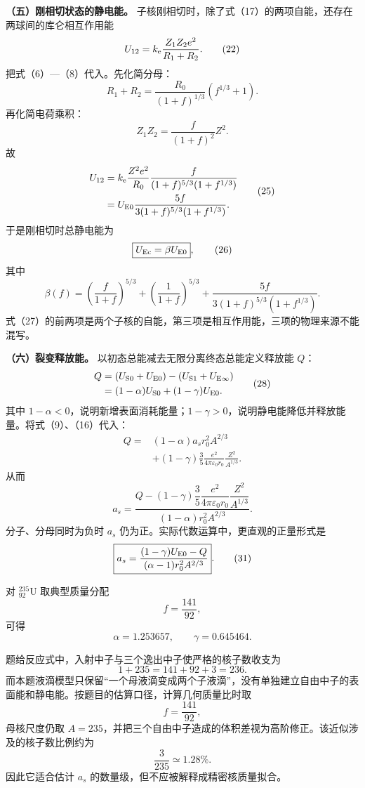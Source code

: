 \documentclass[12pt,a4paper,UTF8]{ctexart}
\begin{document}
\textbf{（五）刚相切状态的静电能。}
子核刚相切时，除了式（17）的两项自能，还存在两球间的库仑相互作用能 \[
U_{12}=k_{\rm e}\frac{Z_1Z_2e^2}{R_1+R_2}. \tag{22}
\] 把式（6）---（8）代入。先化简分母： \[
R_1+R_2
=\frac{R_0}{(1+f)^{1/3}}\left(f^{1/3}+1\right). \tag{23}
\] 再化简电荷乘积： \[
Z_1Z_2=\frac{f}{(1+f)^2}Z^2. \tag{24}
\] 故 \[
\begin{aligned}
U_{12}
&=k_{\rm e}\frac{Z^2e^2}{R_0}
\frac{f}{(1+f)^{5/3}(1+f^{1/3})}\\
&=U_{\rm E0}
\frac{5f}{3(1+f)^{5/3}(1+f^{1/3})}.
\end{aligned} \tag{25}
\] 于是刚相切时总静电能为 \[
\boxed{
U_{\rm Ec}=\beta U_{\rm E0}
}, \tag{26}
\] 其中 \[
\boxed{
\beta(f)=
\left(\frac{f}{1+f}\right)^{5/3}
+\left(\frac1{1+f}\right)^{5/3}
+\frac{5f}{3(1+f)^{5/3}(1+f^{1/3})}
}. \tag{27}
\]
式（27）的前两项是两个子核的自能，第三项是相互作用能，三项的物理来源不能混写。

\textbf{（六）裂变释放能。} 以初态总能减去无限分离终态总能定义释放能
\(Q\)： \[
\begin{aligned}
Q
&=(U_{\rm S0}+U_{\rm E0})
-(U_{\rm S1}+U_{\rm E\infty})\\
&=(1-\alpha)U_{\rm S0}
+(1-\gamma)U_{\rm E0}.
\end{aligned} \tag{28}
\] 其中
\(1-\alpha<0\)，说明新增表面消耗能量；\(1-\gamma>0\)，说明静电能降低并释放能量。将式（9）、（16）代入：
\[
\begin{aligned}
Q
={}&(1-\alpha)a_sr_0^2A^{2/3}\\
&+(1-\gamma)\frac35
\frac{e^2}{4\pi\varepsilon_0r_0}
\frac{Z^2}{A^{1/3}}.
\end{aligned} \tag{29}
\] 从而 \[
\boxed{
a_s=
\frac{
Q-(1-\gamma)\dfrac35
\dfrac{e^2}{4\pi\varepsilon_0r_0}
\dfrac{Z^2}{A^{1/3}}
}{
(1-\alpha)r_0^2A^{2/3}
}
}. \tag{30}
\] 分子、分母同时为负时 \(a_s\)
仍为正。实际代数运算中，更直观的正量形式是 \[
\boxed{
a_s=
\frac{
(1-\gamma)U_{\rm E0}-Q
}{
(\alpha-1)r_0^2A^{2/3}
}
}. \tag{31}
\]

对 \(^{235}_{92}\mathrm U\) 取典型质量分配 \[
f=\frac{141}{92},
\] 可得 \[
\alpha=1.253657,\qquad
\gamma=0.645464. \tag{32}
\]

题给反应式中，入射中子与三个逸出中子使严格的核子数收支为 \[
1+235=141+92+3=236.
\]
而本题液滴模型只保留``一个母液滴变成两个子液滴''，没有单独建立自由中子的表面能和静电能。按题目的估算口径，计算几何质量比时取
\[
f=\frac{141}{92},
\] 母核尺度仍取
\(A=235\)，并把三个自由中子造成的体积差视为高阶修正。该近似涉及的核子数比例约为
\[
\frac3{235}\simeq1.28\%.
\] 因此它适合估计 \(a_s\) 的数量级，但不应被解释成精密核质量拟合。
\end{document}
